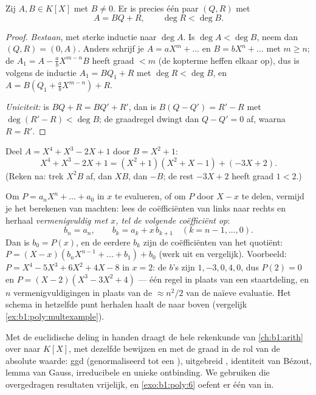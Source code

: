 \begin{theorem}\label{thm:b1:poly:division}
Zij $A, B \in K[X]$ met $B \neq 0$. Er is precies één paar $(Q, R)$
 met
\[
A = BQ + R, \qquad \deg R < \deg B .
\]
\end{theorem}

\begin{proof}
\emph{Bestaan}, met sterke inductie naar $\deg A$. Is $\deg A < \deg B$,
neem dan $(Q, R) = (0, A)$. Anders schrijf je $A = a X^m + \dots$ en $B =
b X^n + \dots$ met $m \geq n$; de  $A_1 = A - \frac ab X^{m-n} B$
heeft graad $< m$ (de kopterme heffen elkaar op), dus is volgens de
inductie $A_1 = BQ_1 + R$ met $\deg R < \deg B$, en $A = B(Q_1 + \frac ab
X^{m-n}) + R$.

\emph{Uniciteit:} is $BQ + R = BQ' + R'$, dan is $B(Q - Q') = R' - R$ met
$\deg(R' - R) < \deg B$; de graadregel dwingt dan $Q - Q' = 0$ af, waarna
$R = R'$.
\end{proof}

\begin{example}\label{ex:b1:poly:division}
Deel $A = X^4 + X^3 - 2X + 1$ door $B = X^2 + 1$:
\[
X^4 + X^3 - 2X + 1 = (X^2 + 1)(X^2 + X - 1) + (-3X + 2).
\]
(Reken na: trek $X^2 B$ af, dan $X B$, dan $-B$; de rest $-3X + 2$ heeft
graad $1 < 2$.)
\end{example}

\begin{method}\label{met:b1:poly:horner}
Om $P = a_nX^n + \dots + a_0$ in $x$ te evalueren, of om $P$ door $X - x$
te delen, vermijd je het berekenen van machten: lees de coëfficiënten van
links naar rechts en herhaal \emph{vermenigvuldig met $x$, tel de
volgende coëfficiënt op}:
\[
b_n = a_n, \qquad b_{k} = a_{k} + x\,b_{k+1}
\quad (k = n-1, \dots, 0) .
\]
Dan is $b_0 = P(x)$, en de eerdere $b_k$ zijn de coëfficiënten van het
quotiënt: $P = (X - x)(b_nX^{n-1} + \dots + b_1) + b_0$ (werk uit en
vergelijk). Voorbeeld: $P = X^4 - 5X^3 + 6X^2 + 4X - 8$ in $x = 2$: de
$b$'s zijn $1, -3, 0, 4, 0$, dus $P(2) = 0$ en $P = (X-2)(X^3 - 3X^2 +
4)$ --- één regel in plaats van een staartdeling, en $n$
vermenigvuldigingen in plaats van de $\approx n^2/2$ van de naïeve
evaluatie. Het schema in hetzelfde punt herhalen haalt de
 naar boven (vergelijk \cref{ex:b1:poly:multexample}).
\end{method}

\begin{remark}
Met de euclidische deling in handen draagt de hele rekenkunde van
\cref{ch:b1:arith} over naar $K[X]$, met dezelfde bewijzen en met de
graad in de rol van de absolute waarde: ggd (genormaliseerd tot een
), uitgebreid , identiteit van
Bézout, lemma van Gauss, irreducibele  en unieke ontbinding. We
gebruiken die overgedragen resultaten vrijelijk, en
\cref{exo:b1:poly:6} oefent er één van in.
\end{remark}

